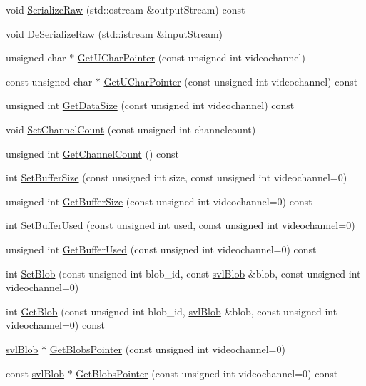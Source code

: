\begin{DoxyCompactItemize}
\item 
void \hyperlink{classsvl_sample_blobs_a4b527d3e86a9f9149da57f273ba713b1}{Serialize\-Raw} (std\-::ostream \&output\-Stream) const 
\item 
void \hyperlink{classsvl_sample_blobs_a962040ab219b9f0beeef492c2f74e855}{De\-Serialize\-Raw} (std\-::istream \&input\-Stream)
\item 
unsigned char $\ast$ \hyperlink{classsvl_sample_blobs_aae1ebb706b941f782710a19b73fc9615}{Get\-U\-Char\-Pointer} (const unsigned int videochannel)
\item 
const unsigned char $\ast$ \hyperlink{classsvl_sample_blobs_a0a0a842bc90e3d591dbafdf0a1a58c36}{Get\-U\-Char\-Pointer} (const unsigned int videochannel) const 
\item 
unsigned int \hyperlink{classsvl_sample_blobs_a1f40ae9098c9ae19a9f1dad7c283c2b5}{Get\-Data\-Size} (const unsigned int videochannel) const 
\item 
void \hyperlink{classsvl_sample_blobs_ac0029f7fdf03ad4559f1abb132d4ac9d}{Set\-Channel\-Count} (const unsigned int channelcount)
\item 
unsigned int \hyperlink{classsvl_sample_blobs_a3de2572eec6b5e2bdae9d4472b265ef9}{Get\-Channel\-Count} () const 
\item 
int \hyperlink{classsvl_sample_blobs_aa97375adff6bc34248b6a69fc3a79c8b}{Set\-Buffer\-Size} (const unsigned int size, const unsigned int videochannel=0)
\item 
unsigned int \hyperlink{classsvl_sample_blobs_a9af79089dbc65741d44be58fb0767df6}{Get\-Buffer\-Size} (const unsigned int videochannel=0) const 
\item 
int \hyperlink{classsvl_sample_blobs_a2008932bc13d6702dfd9e89bcc56eecb}{Set\-Buffer\-Used} (const unsigned int used, const unsigned int videochannel=0)
\item 
unsigned int \hyperlink{classsvl_sample_blobs_a3a82b0b8e79de2aee85c2d33a3aeb1d4}{Get\-Buffer\-Used} (const unsigned int videochannel=0) const 
\item 
int \hyperlink{classsvl_sample_blobs_a5f701c31afc7843480dc6ebd34e78283}{Set\-Blob} (const unsigned int blob\-\_\-id, const \hyperlink{structsvl_blob}{svl\-Blob} \&blob, const unsigned int videochannel=0)
\item 
int \hyperlink{classsvl_sample_blobs_a19fcfcd2b05d778a2b9d73847bb831b5}{Get\-Blob} (const unsigned int blob\-\_\-id, \hyperlink{structsvl_blob}{svl\-Blob} \&blob, const unsigned int videochannel=0) const 
\item 
\hyperlink{structsvl_blob}{svl\-Blob} $\ast$ \hyperlink{classsvl_sample_blobs_a78846046a65f0efa3deb0a42b44fb00b}{Get\-Blobs\-Pointer} (const unsigned int videochannel=0)
\item 
const \hyperlink{structsvl_blob}{svl\-Blob} $\ast$ \hyperlink{classsvl_sample_blobs_af3c473d242afbeda324314e54d003ec1}{Get\-Blobs\-Pointer} (const unsigned int videochannel=0) const 
\end{DoxyCompactItemize}
